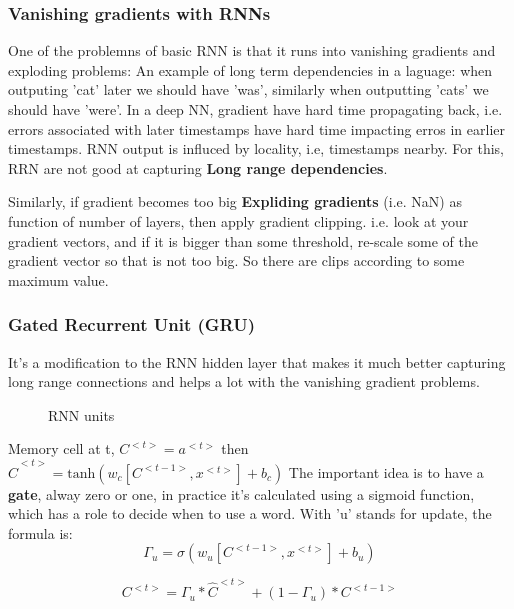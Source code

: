 \subsubsection{Vanishing gradients with RNNs}
One of the problemns of basic RNN is that it runs into vanishing gradients and exploding problems:
An example of long term dependencies in a laguage: when outputing 'cat' later we should have 'was', similarly when outputting 'cats' we should have 'were'. 
In a deep NN, gradient have hard time propagating back, i.e. errors associated with later timestamps have hard time impacting erros in earlier timestamps.
RNN output is influced by locality, i.e, timestamps nearby. For this, RRN are not good at capturing \textbf{Long range dependencies}.

Similarly, if gradient becomes too big \textbf{Expliding gradients} (i.e. NaN) as function of number of layers, then apply gradient clipping. i.e. look at your gradient vectors, and if it is bigger than some threshold, re-scale some of the gradient vector so that is not too big. So there are clips according to some maximum value.


\subsubsection{Gated Recurrent Unit (GRU)}
It's a modification to the RNN hidden layer that makes it much better capturing long range connections and helps a lot with the vanishing gradient problems.

\begin{figure}[H]
\hfill
{}
\hfill
{}
\hfill
\caption{RNN units}
\end{figure}

Memory cell at t, $C^{<t>} = a^{<t>}$ then $\hat{C}^{<t>} = \text{tanh}(w_c[C^{<t-1>}, x^{<t>}] + b_c)$
The important idea is to have a \textbf{gate}, alway zero or one, in practice it's calculated using a sigmoid function, which has a role to decide when to use a word. With 'u' stands for update, the formula is:
\begin{equation*}
  \Gamma_u = \sigma (w_u[C^{<t-1>}, x^{<t>}] + b_u)
\end{equation*}

\begin{equation*}
C^{<t>} = \Gamma_u * \hat{C}^{<t>} + (1 - \Gamma_u) * C^{<t-1>}
\end{equation*}

